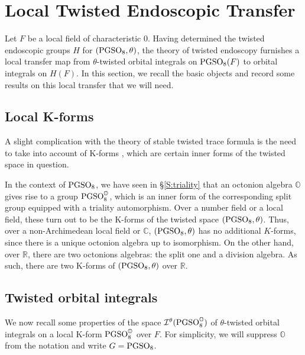 \documentclass[11pt]{amsart}
\theoremstyle{plain}
\numberwithin{equation}{section}
\newcommand{\R}{\mathbb R}
\newcommand{\C}{\mathbb C}
\def\PGSO{{\rm PGSO}}
\def\R{{\mathbb R}}
\def\C{{\bf C}}
\def\C{{\mathbb C}}
\begin{document}
\vskip 10pt


\section{\bf Local Twisted Endoscopic Transfer}  \label{S:LET}
Let $F$ be a local field of characteristic $0$. 
Having determined the twisted endoscopic groups $H$ for $(\PGSO_8, \theta)$, the theory of twisted endoscopy furnishes a local transfer map from $\theta$-twisted orbital integrals  on $\PGSO_8(F)$ to orbital integrals on $H(F)$. In this section, we recall the basic objects and record some results on this local transfer that we will need.
\vskip 5pt

\subsection{\bf Local K-forms} \label{SS:local-K}
 A slight complication with the theory of stable twisted trace formula is the need to take into account of K-forms \cite[\S I.1.11]{MW1}, which are certain inner forms of the twisted space in question.
 \vskip 5pt
 
   In the context of $\PGSO_8$, we have seen in 
\S \ref{S:triality} that an octonion algebra $\mathbb{O}$ gives rise to a group $\PGSO_8^{\mathbb{O}}$, which is an inner form of the corresponding split group equipped with a triality automorphism. Over a number field or a local field,  these turn out to be the K-forms of the twisted space $(\PGSO_8, \theta)$.  Thus, over  a non-Archimedean local field  or $\C$, $(\PGSO_8, \theta)$ has no additional $K$-forms,  since there is a unique octonion algebra up to isomorphism. On the other hand,  over $\R$, there are two octonions algebras: the split one and a division algebra. As such, there are two K-forms of $(\PGSO_8, \theta)$ over $\R$.  
\vskip 5pt

 

\vskip 5pt

\subsection{\bf Twisted orbital integrals}
We now recall some properties of the space $\mathcal{I}^{\theta}(\PGSO^{\mathbb{O}}_8)$ of $\theta$-twisted orbital integrals on  a local K-form $\PGSO^{\mathbb{O}}_8$ over $F$. For simplicity, we will suppress $\mathbb{O}$ from the notation and write $G = \PGSO_8$.
 
\vskip 5pt
\end{document}
